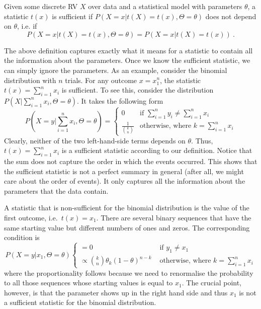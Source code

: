 \begin{Definition}\label{def:discreteSuffStat}
Given some discrete RV $ X $ over data and a statistical model with parameters $ \theta $, 
a statistic $ t(x) $ is sufficient if $ P(X=x|t(X) = t(x), \Theta = \theta) $ does not depend on $ \theta $,
i.e. if 
$$ P(X=x|t(X) = t(x), \Theta = \theta) = P(X=x|t(X) = t(x)) \ . $$
\end{Definition}

The above definition captures exactly what it means for a statistic to contain all the information
about the parameters. Once we know the sufficient statistic, we can simply ignore the parameters. As an
example, consider the binomial distribution with $ n $ trials. For any outcome $ x=x_{1}^{n} $,
the statistic $ t(x) = \sum_{i=1}^{n} x_{i} $ is sufficient. To see this, consider the distribution
$ P(X|\sum_{i=1}^{n} x_{i}, \Theta = \theta) $. It takes the following form
\begin{equation*}
P\left( X=y|\sum_{i=1}^{n} x_{i}, \Theta = \theta \right) = 
\begin{cases}
0 & \mbox{if } \sum_{i=1}^{n} y_{i} \not = \sum_{i=1}^{n} x_{i} \\
\frac{1}{\binom{k}{n}} & \mbox{otherwise, where } k = \sum_{i=1}^{n} x_{i}
\end{cases}
\end{equation*}
Clearly, neither of the two left-hand-side terms depends on $ \theta $. Thus, $ t(x) = \sum_{i=1}^{n} x_{i} $
is a sufficient statistic according to our definition. Notice that the sum does not capture the
order in which the events occurred. This shows that the sufficient statistic is not a perfect summary
in general (after all, we might care about the order of events). It only captures all the information
about the parameters that the data contain.

A statistic that is non-sufficient for the binomial distribution is the value of the first outcome, i.e.\ 
$ t(x) = x_{1} $. There are several binary sequences that have the same starting value but
different numbers of ones and zeros. The corresponding condition is
\begin{equation*}
P(X=y|x_{1}, \Theta = \theta)
\begin{cases}
= 0 & \mbox{ if } y_{1} \not = x_{1} \\
\propto \binom{k}{n} \theta_{k} (1 - \theta)^{n-k} & \mbox{ otherwise, where } k = \sum_{i=1}^{n} x_{i}
\end{cases}
\end{equation*}
where the proportionality follows because we need to renormalise the probability to all those
sequences whose starting values is equal to $ x_{1} $. The crucial point, however, is that the parameter
shows up in the right hand side and thus $ x_{1} $ is not a sufficient statistic for the binomial
distribution.


